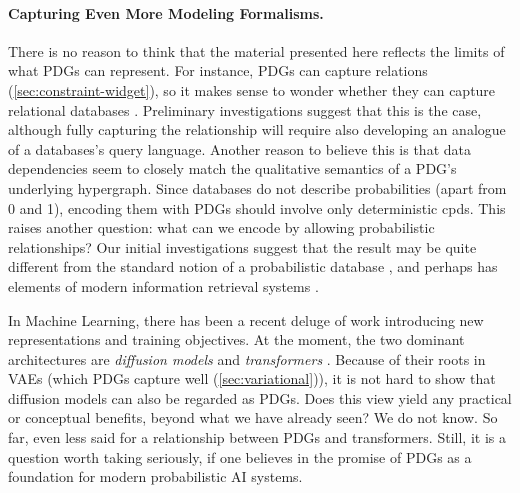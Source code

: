 \paragraph{Capturing Even More Modeling Formalisms.}
There is no reason to think that the material presented here reflects the limits of what PDGs can represent. 
%
For instance, PDGs can capture relations (\cref{sec:constraint-widget}), so it makes sense to wonder whether they can capture relational databases
    \citep{abiteboul1995foundations}. 
Preliminary investigations suggest that this is the case,
    although fully capturing the relationship will require also developing an analogue of a databases's query language.  
Another reason to believe this is that data dependencies \citep{fagin1986theory} seem to closely match the qualitative semantics of a PDG's underlying hypergraph. 
Since databases do not describe probabilities (apart from 0 and 1), 
    encoding them with PDGs should involve only deterministic cpds.
This raises another question: what can we encode by allowing probabilistic relationships?
Our initial investigations suggest that the result may be quite different from the standard notion of a probabilistic database \citep{suciu2011probabilistic}, and perhaps has elements of modern information retrieval systems \citep{mitra-neural-info-retrieval,karpukhin2020dense}.
%
%

In Machine Learning, there has been a recent deluge of work introducing new representations and training objectives. At the moment, the two dominant architectures are \emph{diffusion models} \citep{pmlr-v37-sohl-dickstein15,ho2020denoising} and \emph{transformers} \citep{vaswani-attn}. 
Because of their roots in VAEs (which PDGs capture well (\cref{sec:variational})), it is not hard to show that diffusion models can also be regarded as PDGs. %
    Does this view yield any practical or conceptual benefits, beyond what we have already seen? 
    We do not know.
%
So far, even less said for a relationship between PDGs and transformers.
Still, it is a question worth taking seriously, if one believes in the promise of PDGs as a foundation for modern probabilistic AI systems.      

